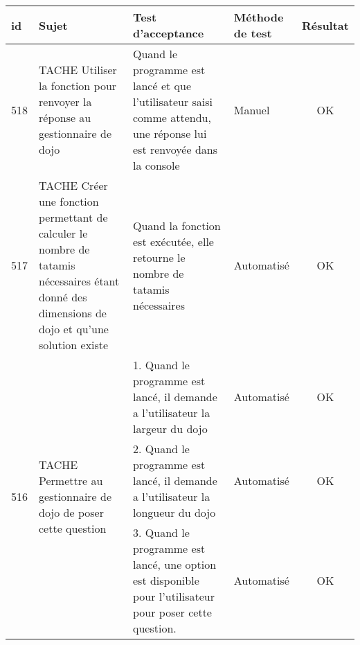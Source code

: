 \begin{adjustwidth}{-1.5cm}{0cm}
    \renewcommand{\arraystretch}{1.2}
    {\setlength{\tabcolsep}{1.5 mm}
        \begin{tabular}{|m{0.6cm}|m{5.5cm}|m{8cm}|m{2cm}|c|} \hline
            id                                                                             & Sujet                                                                                & Test d'acceptance                                                                                        & Méthode de test & Résultat \\ \hline
            518                                                                            & TACHE Utiliser la fonction pour renvoyer la réponse au gestionnaire de dojo          &
            Quand le programme est lancé et que l'utilisateur saisi comme attendu,
            une réponse lui est renvoyée dans la console                                   & Manuel                                                                               & OK                                                                                                                                    \\ \hline
            517                                                                            & TACHE Créer une fonction permettant de calculer le nombre de tatamis nécessaires
            étant donné des dimensions de dojo et qu'une solution existe                   &
            Quand la fonction est exécutée, elle retourne le nombre de tatamis nécessaires &
            Automatisé                                                                     & OK                                                                                                                                                                                                                           \\ \hline
            \multirow{3}{0.6cm}{516}                                                       & \multirow{3}{5.5cm}{TACHE Permettre au gestionnaire de dojo de poser cette question} & 1. Quand le programme est lancé, il demande a l'utilisateur la largeur du dojo                           & Automatisé      & OK       \\ \cline{3-5}
                                                                                           &                                                                                      & 2. Quand le programme est lancé, il demande a l'utilisateur la longueur du dojo                          & Automatisé      & OK       \\ \cline{3-5}
                                                                                           &                                                                                      & 3. Quand le programme est lancé, une option est disponible pour l'utilisateur pour poser cette question. & Automatisé      & OK       \\ \hline
        \end{tabular}}
\end{adjustwidth}


